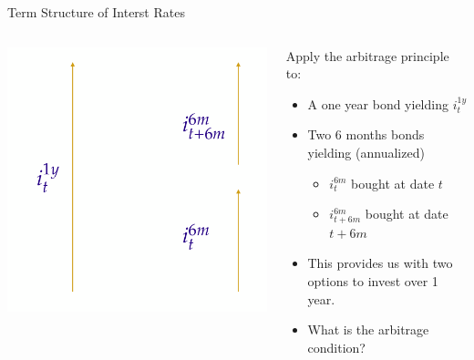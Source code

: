 \documentclass[
  ignorenonframetext,
  aspectratio=169,
]{beamer}
\providecommand{\tightlist}{%
  \setlength{\itemsep}{0pt}\setlength{\parskip}{0pt}}\usepackage{longtable,booktabs,array}
\begin{document}
\begin{frame}{Term Structure of Interst Rates}
\begin{columns}[T]
\begin{column}{0.48\textwidth}
\includegraphics{arbitrage_2.png}
\end{column}

\begin{column}{0.48\textwidth}
Apply the arbitrage principle to:

\begin{itemize}
\tightlist
\item
  A one year bond yielding \(i_t^{1y}\)
\item
  Two 6 months bonds yielding (annualized)

  \begin{itemize}
  \tightlist
  \item
    \(i_t^{6m}\) bought at date \(t\)
  \item
    \(i_{t+6m}^{6m}\) bought at date \(t+6m\)
  \end{itemize}
\item
  This provides us with two options to invest over 1 year.
\item
  What is the arbitrage condition?
\end{itemize}
\end{column}
\end{columns}
\end{frame}
\end{document}
